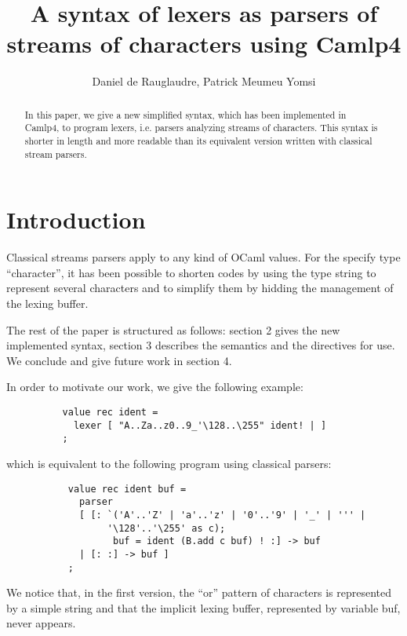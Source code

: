\documentclass[11pt]{article}
\begin{document}
\title{A syntax of lexers as parsers of streams of characters using Camlp4}
\date{}
\author{Daniel de Rauglaudre, Patrick Meumeu Yomsi}
\thispagestyle{empty}

\maketitle

\begin{abstract}
In this paper, we give a new simplified syntax, which has been
implemented in Camlp4, to program lexers, i.e. parsers analyzing
streams of characters. This syntax is shorter in length and more
readable than its equivalent version written with classical stream
parsers.
\end{abstract}

\section{Introduction}

Classical streams parsers apply to any kind of OCaml values. For
the specify type ``character'', it has been possible to shorten codes by
using the type string to represent several characters and to simplify
them by hidding the management of the lexing buffer.

The rest of the paper is structured as follows: section 2 gives the
new implemented syntax, section 3 describes the semantics and the
directives for use. We conclude and give future work in section 4.

In order to motivate our work, we give the following example:

\begin{verbatim}
          value rec ident =
            lexer [ "A..Za..z0..9_'\128..\255" ident! | ]
          ;
\end{verbatim}

which is equivalent to the following program using classical parsers:

\begin{verbatim}
           value rec ident buf =
             parser
             [ [: `('A'..'Z' | 'a'..'z' | '0'..'9' | '_' | ''' |
                  '\128'..'\255' as c);
                   buf = ident (B.add c buf) ! :] -> buf
             | [: :] -> buf ]
           ;
\end{verbatim}

We notice that, in the first version, the ``or'' pattern of characters
is represented by a simple string and that the implicit lexing buffer,
represented by variable buf, never appears.
\end{document}
